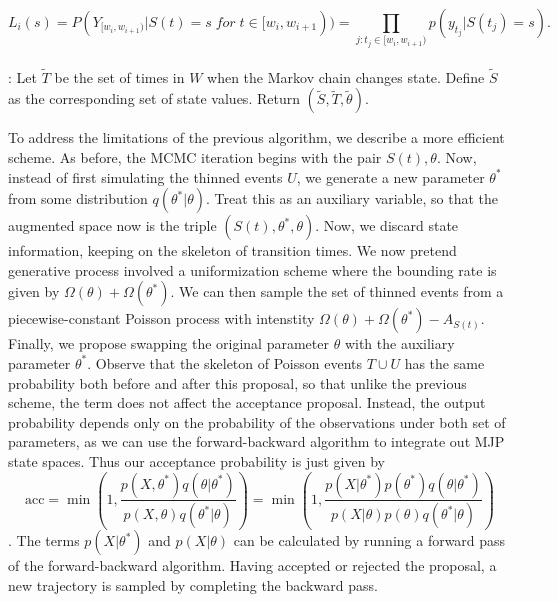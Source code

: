 \begin{algorithm}[H]
\begin{algorithmic}
    $$ L_i(s) = P(Y_{[w_i, w_{i + 1})} | S(t) = s \; for\; t \in [w_i, w_{i + 1})) = \prod_{j: t_j \in [w_i, w_{i + 1})}p(y_{t_j} | S(t_j) = s).$$\\
    : Let $\tilde{T}$ be the set of times in $W$ when the Markov chain changes state. Define $\tilde{S}$ as the corresponding set of state values. Return $(\tilde{S}, \tilde{T}, \tilde{\theta})$.\\
\end{algorithmic}
\end{algorithm}

To address the limitations of the previous algorithm, we describe
a more efficient scheme.
As before, the MCMC iteration begins with the pair $S(t), \theta$. 
Now, instead of first simulating the thinned events $U$, we generate 
a new parameter $\theta^*$ from some distribution $q(\theta^*|\theta)$.
Treat this as an auxiliary variable, so that the augmented
space now is the triple $(S(t), \theta^*,\theta)$. Now, we discard
state information, keeping on the skeleton of transition times.
We now pretend generative process involved a uniformization scheme
where the bounding rate is given by $\Omega(\theta) + \Omega(\theta^*)$.
We can then sample the set of thinned events from a piecewise-constant
Poisson process with intenstity $\Omega(\theta) + \Omega(\theta^*) - 
A_{S(t)}$. Finally, we propose swapping the original parameter
$\theta$ with the auxiliary parameter $\theta^*$. Observe that the
skeleton of Poisson events $T \cup U$ has the same probability both
before and after this proposal, so that unlike the previous scheme,
the term does not affect the acceptance proposal. Instead, the output
probability depends only on the probability of the observations
under both set of parameters, as we can use the forward-backward algorithm
to integrate out MJP state spaces. Thus our acceptance probability is
just given by
$$ \text{acc} = 
  \min\left(1, \frac{p(X,\theta^*)q(\theta|\theta^*)}
   {p(X,\theta)q(\theta^*|\theta)}\right) = 
  \min\left(1, \frac{p(X|\theta^*)p(\theta^*)q(\theta|\theta^*)}
   {p(X|\theta)p(\theta)q(\theta^*|\theta)}\right)
   $$.
   The terms $p(X|\theta^*)$ and  $p(X|\theta)$ can be calculated by 
   running a forward pass of the forward-backward algorithm. Having
   accepted or rejected the proposal, a new trajectory is sampled by
   completing the backward pass.
